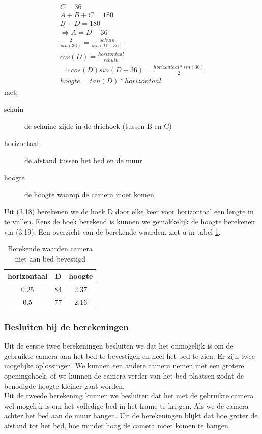 \begin{gather}
C=36\\
A+B+C=180 \\
B+D=180 \\
\Rightarrow A=D-36\\
\frac{2}{sin(36)}=\frac{schuin}{sin(D-36)}\\
cos(D)=\frac{horizontaal}{schuin}\\
\Rightarrow cos(D)sin(D-36)=\frac{horizontaal*sin(36)}{2}\\
hoogte=tan(D)*horizontaal
\end{gather}
met:
\begin{description}
	\item[schuin] de schuine zijde in de driehoek (tussen B en C)
	\item[horizontaal] de afstand tussen het bed en de muur
	\item[hoogte] de hoogte waarop de camera moet komen
\end{description}
Uit (3.18) berekenen we de hoek D door elke keer voor horizontaal een lengte in te vullen. Eens de hoek berekend is kunnen we gemakkelijk de hoogte berekenen via (3.19). Een overzicht van de berekende waarden, ziet u in tabel \ref{refTabCNB}.

\begin{table}[hbp]
	\caption{Berekende waarden camera niet aan bed bevestigd}
	\begin{tabular}{|c|c|c|}
		\hline
		horizontaal & D & hoogte \\ \hline
		0.25 & 84 & 2.37 \\ \hline
		0.5 & 77 & 2.16 \\ 
		\hline
	\end{tabular}
	\label{refTabCNB}
\end{table}

\subsubsection{Besluiten bij de berekeningen}
Uit de eerste twee berekeningen besluiten we dat het onmogelijk is om de gebruikte camera aan het bed te bevestigen en heel het bed te zien. Er zijn twee mogelijke oplossingen. We kunnen een andere camera nemen met een grotere openingshoek, of we kunnen de camera verder van het bed plaatsen zodat de benodigde hoogte kleiner gaat worden.\\
Uit de tweede berekening kunnen we besluiten dat het met de gebruikte camera wel mogelijk is om het volledige bed in het frame te krijgen. Als we de camera achter het bed aan de muur hangen. Uit de berekeningen blijkt dat hoe groter de afstand tot het bed, hoe minder hoog de camera moet komen te hangen.

